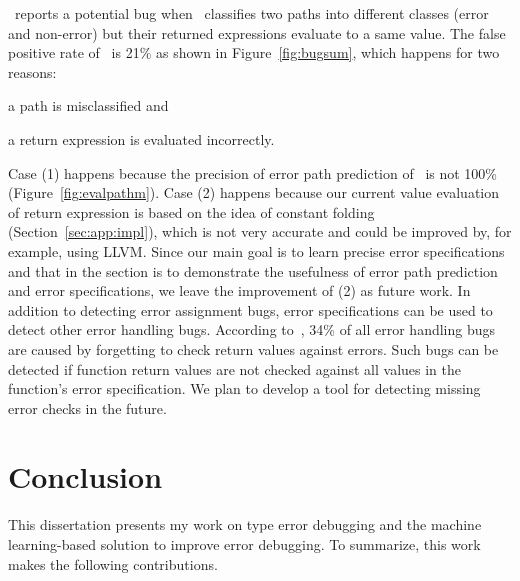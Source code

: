 \documentclass[12pt]{report}	%
\begin{document}
\bugTool\ reports a potential bug when \newTool\ classifies two paths 
into different classes (error and non-error) but their returned expressions
evaluate to a same value.
%
The false positive rate of \bugTool\
is 21\% as shown in Figure~\ref{fig:bugsum},
which happens for two reasons: 
%
\begin{enumerate*}[label=(\arabic*)]
\item a path is misclassified and
\item a return expression is evaluated incorrectly.
\end{enumerate*}
%
Case (1) happens because the precision of error path prediction
of \newTool\ is not 100\% (Figure~\ref{fig:evalpathm}). 
Case (2) happens because our current
value evaluation of return expression is based on the idea of constant 
folding (Section~\ref{sec:app:impl}), which is not very accurate 
and could be improved by, for example, using LLVM.
%
Since our main goal is to learn precise error specifications
and that in the section is to demonstrate the usefulness of error path
prediction and error specifications, we leave the improvement
of (2) as future work.
%
In addition to detecting error assignment bugs, error 
specifications can be used to detect other error handling bugs.
%
According to~\cite{Tian:2017:ADR}, 
34\% of all error handling bugs are caused by
forgetting to check return values against errors.
%
%
Such bugs can be detected if function return values are not
checked against all values in the function's error specification.
%
We plan to develop a tool for detecting missing error checks in the future.



\chapter{Conclusion}
\label{sec:conclusion}

This dissertation presents my work on type error debugging and 
the machine learning-based solution to improve error debugging.
To summarize, this work makes the following contributions.
\end{document}
